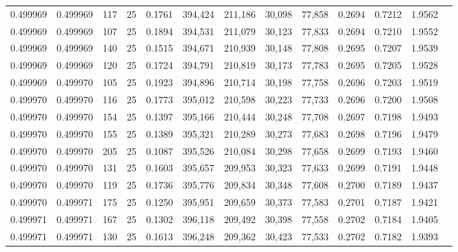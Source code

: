 \begin{tabular}{rrrrrrrrrrrrr}
0.499969 & 0.499969 &   117 &  25 &                                     0.1761 & 394,424 & 211,186 &  30,098 &  77,858 & 0.2694 & 0.7212 & 1.9562 \\
0.499969 & 0.499969 &   107 &  25 &                                     0.1894 & 394,531 & 211,079 &  30,123 &  77,833 & 0.2694 & 0.7210 & 1.9552 \\
0.499969 & 0.499969 &   140 &  25 &                                     0.1515 & 394,671 & 210,939 &  30,148 &  77,808 & 0.2695 & 0.7207 & 1.9539 \\
0.499969 & 0.499969 &   120 &  25 &                                     0.1724 & 394,791 & 210,819 &  30,173 &  77,783 & 0.2695 & 0.7205 & 1.9528 \\
0.499969 & 0.499970 &   105 &  25 &                                     0.1923 & 394,896 & 210,714 &  30,198 &  77,758 & 0.2696 & 0.7203 & 1.9519 \\
0.499970 & 0.499970 &   116 &  25 &                                     0.1773 & 395,012 & 210,598 &  30,223 &  77,733 & 0.2696 & 0.7200 & 1.9508 \\
0.499970 & 0.499970 &   154 &  25 &                                     0.1397 & 395,166 & 210,444 &  30,248 &  77,708 & 0.2697 & 0.7198 & 1.9493 \\
0.499970 & 0.499970 &   155 &  25 &                                     0.1389 & 395,321 & 210,289 &  30,273 &  77,683 & 0.2698 & 0.7196 & 1.9479 \\
0.499970 & 0.499970 &   205 &  25 &                                     0.1087 & 395,526 & 210,084 &  30,298 &  77,658 & 0.2699 & 0.7193 & 1.9460 \\
0.499970 & 0.499970 &   131 &  25 &                                     0.1603 & 395,657 & 209,953 &  30,323 &  77,633 & 0.2699 & 0.7191 & 1.9448 \\
0.499970 & 0.499970 &   119 &  25 &                                     0.1736 & 395,776 & 209,834 &  30,348 &  77,608 & 0.2700 & 0.7189 & 1.9437 \\
0.499970 & 0.499971 &   175 &  25 &                                     0.1250 & 395,951 & 209,659 &  30,373 &  77,583 & 0.2701 & 0.7187 & 1.9421 \\
0.499971 & 0.499971 &   167 &  25 &                                     0.1302 & 396,118 & 209,492 &  30,398 &  77,558 & 0.2702 & 0.7184 & 1.9405 \\
0.499971 & 0.499971 &   130 &  25 &                                     0.1613 & 396,248 & 209,362 &  30,423 &  77,533 & 0.2702 & 0.7182 & 1.9393 \\

\end{tabular}
